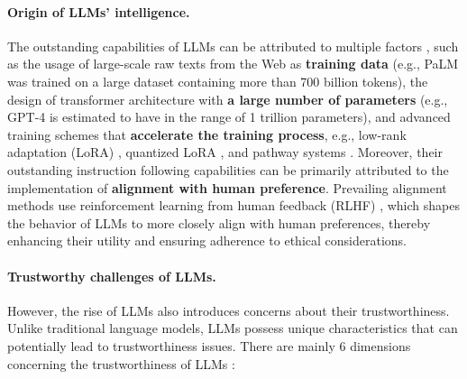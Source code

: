 \documentclass[lang=en]{sjtuarticle}
\begin{document}
\paragraph{Origin of LLMs' intelligence.}
The outstanding capabilities of LLMs can be attributed to multiple factors \cite{sun2024trustllm}, such as the usage of large-scale
raw texts from the Web as \textbf{training data} (e.g., PaLM \cite{anil2023palm} was trained on a large dataset containing more
than 700 billion tokens), the design of transformer architecture with \textbf{a large number of parameters} (e.g.,
GPT-4 \cite{achiam2023gpt} is estimated to have in the range of 1 trillion parameters), and advanced training schemes that
\textbf{accelerate the training process}, e.g., low-rank adaptation (LoRA) \cite{hu2021lora}, quantized LoRA \cite{dettmers2024qlora}, and pathway
systems \cite{barham2022pathways}. Moreover, their outstanding instruction following capabilities can be primarily attributed to the
implementation of \textbf{alignment with human preference}. Prevailing alignment methods use reinforcement
learning from human feedback (RLHF) \cite{ouyang2022training}, which shapes the behavior of LLMs to more closely align with
human preferences, thereby enhancing their utility and ensuring adherence to ethical considerations.

\paragraph{Trustworthy challenges of LLMs.}

However, the rise of LLMs also introduces concerns about their trustworthiness. Unlike traditional language
models, LLMs possess unique characteristics that can potentially lead to trustworthiness issues. There are mainly 6 dimensions concerning the trustworthiness of LLMs \cite{sun2024trustllm}:
\end{document}
